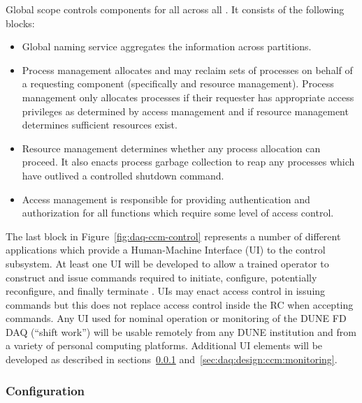Global scope controls  components for all  across all
. 
It consists of the following blocks:


\begin{itemize}
\item Global naming service aggregates the  information across
  partitions.  

\item Process management allocates and may reclaim sets of processes on behalf
  of a requesting component (specifically  and resource management). 
  Process management only allocates processes if their requester has appropriate
  access privileges as determined by access management and if resource
  management determines sufficient resources exist. 
  
\item Resource management determines whether any process allocation can proceed.
  It also enacts process garbage collection to reap any processes which have
  outlived a controlled shutdown command.

\item Access management is responsible for providing authentication and
  authorization for all  functions which require some level of access
  control. 

\end{itemize}

The last block in Figure~\ref{fig:daq-ccm-control} represents a number of
different applications which provide a Human-Machine Interface (UI) to the
control subsystem.
At least one UI will be developed to allow a trained operator to construct and
issue commands required to initiate, configure, potentially reconfigure, and
finally terminate . 
UIs may enact access control in issuing commands but this does not replace
access control inside the RC when accepting commands.
Any UI used for nominal operation or monitoring of the DUNE FD DAQ (``shift
work'') will be usable remotely from any DUNE institution and from a variety of
personal computing platforms.  
Additional UI elements will be developed as described in
sections~\ref{sec:daq:design:ccm:configuration}
and~\ref{sec:daq:design:ccm:monitoring}.


\subsubsection{Configuration}
\label{sec:daq:design:ccm:configuration}

